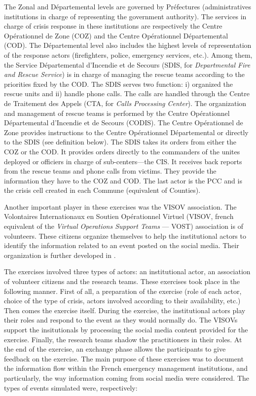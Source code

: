 The Zonal and Départemental levels are governed by Préfectures (administratives institutions in charge of representing the government authority).
The services in charge of crisis response in these institutions are respectively the Centre Opérationnel de Zone (COZ) and the Centre Opérationnel Départemental (COD).
The Départemental level also includes the highest levels of representation of the response actors (firefighters, police, emergency services, etc.).
Among them, the Service Départemental d'Incendie et de Secours (SDIS, for \textit{Departmental Fire and Rescue Service}) is in charge of managing the rescue teams according to the priorities fixed by the COD.
The SDIS serves two function: i) organized the rescue units and ii) handle phone calls.
The calls are handled through the Centre de Traitement des Appels (CTA, for \textit{Calls Processing Center}).
The organization and management of rescue teams is performed by the Centre Opérationnel Départemental d’Incendie et de Secours (CODIS).
The Centre Opérationnel de Zone provides instructions to the Centre Opérationnel Départemental or directly to the SDIS (see definition below).
The SDIS takes its orders from either the COZ or the COD.
It provides orders directly to the commanders of the unites deployed or officiers in charge of sub-centers—the CIS.
It receives back reports from the rescue teams and phone calls from victims.
They provide the information they have to the COZ and COD.
The last actor is the PCC and is the crisis cell created in each Commune (equivalent of Counties).

Another important player in these exercises was the VISOV association.
The Volontaires Internationaux en Soutien Opérationnel Virtuel (VISOV, french equivalent of the \textit{Virtual Operations Support Teams} — VOST) association is of volunteers.
These citizens organize themselves to help the institutional actors to identify the information related to an event posted on the social media.
Their organization is further developed in \textcite[p.122--148]{batardIntegrerContributionsCitoyennes2021}.

The exercises involved three types of actors: an institutional actor, an association of volunteer citizens and the research teams.
These exercises took place in the following manner.
First of all, a preparation of the exercise (role of each actor, choice of the type of crisis, actors involved according to their availability, etc.)
Then comes the exercise itself.
During the exercise, the institutional actors play their roles and respond to the event as they would normally do.
The VISOVs support the insitutionals by processing the social media content provided for the exercise.
Finally, the research teams shadow the practitioners in their roles.
At the end of the exercise, an exchange phase allows the participants to give feedback on the exercise.
The main purpose of these exercises was to document the information flow within the French emergency management institutions, and particularly, the way information coming from social media were considered.
The types of events simulated were, respectively:

